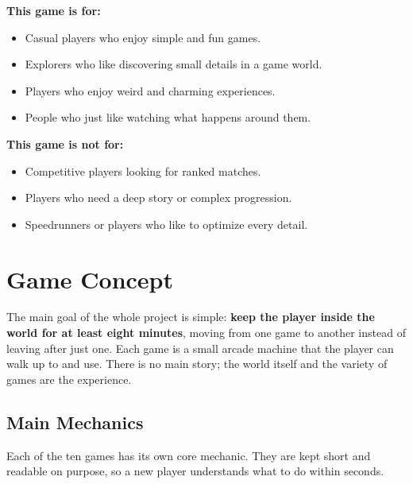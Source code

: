 \documentclass[12pt,letterpaper]{article}
\begin{document}
\textbf{This game is for:}
\begin{itemize}
  \item Casual players who enjoy simple and fun games.
  \item Explorers who like discovering small details in a game world.
  \item Players who enjoy weird and charming experiences.
  \item People who just like watching what happens around them.
\end{itemize}

\textbf{This game is not for:}
\begin{itemize}
  \item Competitive players looking for ranked matches.
  \item Players who need a deep story or complex progression.
  \item Speedrunners or players who like to optimize every detail.
\end{itemize}

\section{Game Concept}

The main goal of the whole project is simple: \textbf{keep the player inside the world for at least eight minutes}, moving from one game to another instead of leaving after just one. Each game is a small arcade machine that the player can walk up to and use. There is no main story; the world itself and the variety of games are the experience.

\subsection{Main Mechanics}

Each of the ten games has its own core mechanic. They are kept short and readable on purpose, so a new player understands what to do within seconds.
\end{document}
